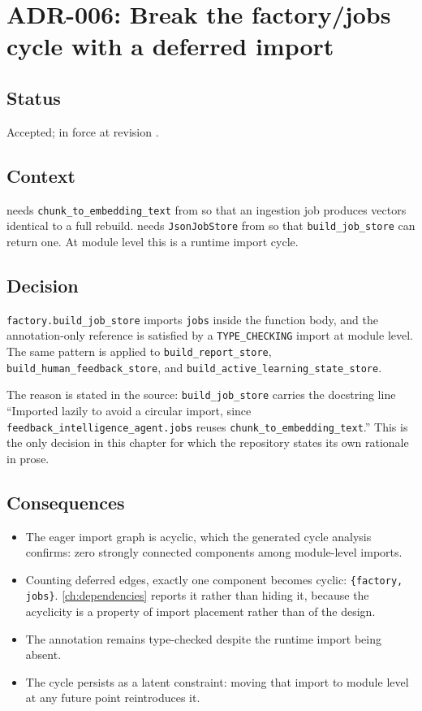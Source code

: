 \section{ADR-006: Break the factory/jobs cycle with a deferred import}
\label{adr:006}

\subsection*{Status}

Accepted; in force at revision \texttt{\projectrevisionshort}.

\subsection*{Context}

 needs \texttt{chunk\_to\_embedding\_text} from  so that
an ingestion job produces vectors identical to a full rebuild. 
needs \texttt{JsonJobStore} from  so that \texttt{build\_job\_store}
can return one. At module level this is a runtime import cycle.

\subsection*{Decision}

\texttt{factory.build\_job\_store} imports \texttt{jobs} inside the function
body, and the annotation-only reference is satisfied by a
\texttt{TYPE\_CHECKING} import at module level. The same pattern is applied to
\texttt{build\_report\_store}, \texttt{build\_human\_feedback\_store}, and
\texttt{build\_active\_learning\_state\_store}.

The reason is stated in the source: \texttt{build\_job\_store} carries the
docstring line ``Imported lazily to avoid a circular import, since
\texttt{feedback\_intelligence\_agent.jobs} reuses
\texttt{chunk\_to\_embedding\_text}.'' This is the only decision in this
chapter for which the repository states its own rationale in prose.

\subsection*{Consequences}

\begin{itemize}
  \item The eager import graph is acyclic, which the generated cycle analysis
    confirms: zero strongly connected components among module-level imports.
  \item Counting deferred edges, exactly one component becomes cyclic:
    \texttt{\{factory, jobs\}}. \cref{ch:dependencies} reports it rather than
    hiding it, because the acyclicity is a property of import placement rather
    than of the design.
  \item The annotation remains type-checked despite the runtime import being
    absent.
  \item The cycle persists as a latent constraint: moving that import to module
    level at any future point reintroduces it.
\end{itemize}

